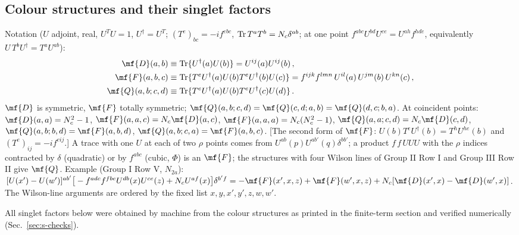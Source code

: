 \subsection{Colour structures and their singlet factors}
\noindent Notation ($U$ adjoint, real, $U^{T}U=1$, $U^{\dagger}=U^{T}$; $(T^{e})_{bc}=-if^{ebc}$, ${\rm Tr}\,T^{a}T^{b}=N_{c}\delta^{ab}$; at one point $f^{abc}U^{bd}U^{ce}=U^{ah}f^{hde}$, equivalently $U\,T^{b}U^{\dagger}=T^{a}U^{ab}$):
\begin{align}
\mf{D}(a,b)&\equiv{\rm Tr}\{U^{\dagger}(a)U(b)\}=U^{ij}(a)U^{ij}(b)\,,\notag\\
\mf{F}(a,b,c)&\equiv{\rm Tr}\{T^{e}U^{\dagger}(a)U(b)T^{e}U^{\dagger}(b)U(c)\}=f^{ijk}f^{lmn}\,U^{il}(a)\,U^{jm}(b)\,U^{kn}(c)\,,\notag\\
\mf{Q}(a,b;c,d)&\equiv{\rm Tr}\{T^{e}U^{\dagger}(a)U(b)T^{e}U^{\dagger}(c)U(d)\}\,.\notag
\end{align}
$\mf{D}$ is symmetric, $\mf{F}$ totally symmetric; $\mf{Q}(a,b;c,d)=\mf{Q}(c,d;a,b)=\mf{Q}(d,c;b,a)$. At coincident points: $\mf{D}(a,a)=N_{c}^{2}-1$, $\mf{F}(a,a,c)=N_{c}\mf{D}(a,c)$, $\mf{F}(a,a,a)=N_{c}(N_{c}^{2}-1)$, $\mf{Q}(a,a;c,d)=N_{c}\mf{D}(c,d)$, $\mf{Q}(a,b;b,d)=\mf{F}(a,b,d)$, $\mf{Q}(a,b;c,a)=\mf{F}(a,b,c)$. [The second form of $\mf{F}$: $U(b)T^{e}U^{\dagger}(b)=T^{h}U^{he}(b)$ and $(T^{e})_{ij}=-if^{eij}$.] A trace with one $U$ at each of two $\rho$ points comes from $U^{ab}(p)U^{ab'}(q)\delta^{bb'}$; a product $f\,f\,UUU$ with the $\rho$ indices contracted by $\delta$ (quadratic) or by $f^{abc}$ (cubic, $\Phi$) is an $\mf{F}$; the structures with four Wilson lines of Group II Row I and Group III Row II give $\mf{Q}$. Example (Group I Row V, $N_{2a}$): $[U(x')-U(w')]^{ab'}\big[-f^{adc}f^{fbe}U^{db}(x)U^{ce}(z)+N_{c}U^{af}(x)\big]\delta^{b'f}=-\mf{F}(x',x,z)+\mf{F}(w',x,z)+N_{c}[\mf{D}(x',x)-\mf{D}(w',x)]$. The Wilson-line arguments are ordered by the fixed list $x,y,x',y',z,w,w'$.

\noindent All singlet factors below were obtained by machine from the colour structures as printed in the finite-term section and verified numerically (Sec.~\ref{sec:s-checks}).

